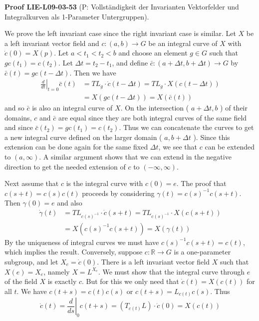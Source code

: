 \documentclass[10pt, letterpaper]{article}
\newcommand{\CustomHeading}[3]{%
  \par\medskip\noindent%
  \textbf{#1 #2} \textnormal{(#3)}.\enskip%
}
\newenvironment{PROOF}[2]{\CustomHeading{Proof}{#1}{#2}}{}
\begin{document}
\begin{PROOF}{LIE-L09-03-53}{P: Vollständigkeit der Invarianten Vektorfelder und Integralkurven als 1-Parameter Untergruppen}
We prove the left invariant case since the right invariant case is similar. Let $X$ be a left invariant vector field and $c:(a, b) \rightarrow G$ be an integral curve of $X$ with $\dot{c}(0)=X(p)$. Let $a<t_{1}<t_{2}<b$ and choose an element $g \in G$ such that $g c\left(t_{1}\right)=c\left(t_{2}\right)$. Let $\Delta t=t_{2}-t_{1}$, and define $\bar{c}:(a+\Delta t, b+\Delta t) \rightarrow G$ by $\bar{c}(t)=g c(t-\Delta t)$. Then we have
$$
\begin{aligned}
\left.\frac{d}{d t}\right|_{t=0} \bar{c}(t) & =T L_{g} \cdot \dot{c}(t-\Delta t)=T L_{g} \cdot X(c(t-\Delta t)) \\
& =X(g c(t-\Delta t))=X(\bar{c}(t))
\end{aligned}
$$
and so $\bar{c}$ is also an integral curve of $X$. On the intersection ( $a+\Delta t, b$ ) of their domains, $c$ and $\bar{c}$ are equal since they are both integral curves of the same field and since $\bar{c}\left(t_{2}\right)=g c\left(t_{1}\right)=c\left(t_{2}\right)$. Thus we can concatenate the curves to get a new integral curve defined on the larger domain ( $a, b+\Delta t$ ). Since this extension can be done again for the same fixed $\Delta t$, we see that $c$ can be extended to $(a, \infty)$. A similar argument shows that we can extend in the negative direction to get the needed extension of $c$ to $(-\infty, \infty)$.

Next assume that $c$ is the integral curve with $c(0)=e$. The proof that $c(s+t)=c(s) c(t)$ proceeds by considering $\gamma(t)=c(s)^{-1} c(s+t)$. Then $\gamma(0)=e$ and also
$$
\begin{aligned}
\dot{\gamma}(t) & =T L_{c(s)^{-1}} \cdot \dot{c}(s+t)=T L_{c(s)^{-1}} \cdot X(c(s+t)) \\
& =X\left(c(s)^{-1} c(s+t)\right)=X(\gamma(t))
\end{aligned}
$$
By the uniqueness of integral curves we must have $c(s)^{-1} c(s+t)=c(t)$, which implies the result. Conversely, suppose $c: \mathbb{R} \rightarrow G$ is a one-parameter subgroup, and let $X_{e}=\dot{c}(0)$. There is a left invariant vector field $X$ such that $X(e)=X_{e}$, namely $X=L^{X_{e}}$. We must show that the integral curve through $e$ of the field $X$ is exactly $c$. But for this we only need that $\dot{c}(t)=X(c(t))$ for all $t$. We have $c(t+s)=c(t) c(s)$ or $c(t+s)=L_{c(t)} c(s)$. Thus
$$
\dot{c}(t)=\left.\frac{d}{d s}\right|_{0} c(t+s)=\left(T_{c(t)} L\right) \cdot \dot{c}(0)=X(c(t))
$$
\end{PROOF}
\end{document}
